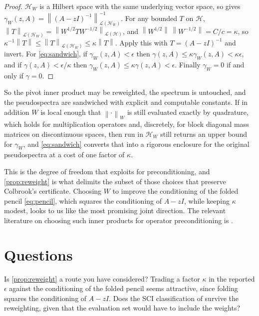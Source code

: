 \documentclass[11pt,a4paper]{article}
\theoremstyle{plain}
\newcommand{\norm}[1]{\left\|#1\right\|}
\newcommand{\Hb}{\mathcal{H}}
\begin{document}
\begin{proof}
  $\Hb_W$ is a Hilbert space with the same underlying vector space, so
  \cite[Lemma~1.2.5]{Colbrook2026} gives $\gamma_W(z,A) = \norm{(A -
  zI)^{-1}}_{\mathcal{L}(\Hb_W)}^{-1}$.  For any bounded $T$ on $\Hb$,
  $\norm{T}_{\mathcal{L}(\Hb_W)} = \norm{W^{1/2}TW^{-1/2}}_{\mathcal{L}(\Hb)}$,
  and $\norm{W^{1/2}}\,\norm{W^{-1/2}} = C/c = \kappa$, so
  $\kappa^{-1}\norm{T} \le \norm{T}_{\mathcal{L}(\Hb_W)} \le \kappa\norm{T}$.
  Apply this with $T = (A - zI)^{-1}$ and invert.  For \cref{eq:sandwich}, if
  $\gamma_W(z,A) < \epsilon$ then $\gamma(z,A) \le \kappa\gamma_W(z,A) <
  \kappa\epsilon$, and if $\gamma(z,A) < \epsilon/\kappa$ then $\gamma_W(z,A)
  \le \kappa\gamma(z,A) < \epsilon$.  Finally $\gamma_W = 0$ if and only if
  $\gamma = 0$.
\end{proof}

So the pivot inner product may be reweighted, the spectrum is untouched, and the
pseudospectra are sandwiched with explicit and computable constants.  If in
addition $W$ is local enough that $\norm{\cdot}_W$ is still evaluated exactly by
quadrature, which holds for multiplication operators and, discretely, for block
diagonal mass matrices on discontinuous spaces, then
\cite[Algorithm~3.4]{Colbrook2026} run in $\Hb_W$ still returns an upper bound
for $\gamma_W$, and \cref{eq:sandwich} converts that into a rigorous enclosure
for the original pseudospectra at a cost of one factor of $\kappa$.

This is the degree of freedom that
\cite{LazzarinoNakatsukasaZerbinati2026} exploits for preconditioning, and
\cref{prop:reweight} is what delimits the subset of those choices that preserve
Colbrook's certificate.  Choosing $W$ to improve the conditioning of the folded
pencil \cref{eq:pencil}, which squares the conditioning of $A - zI$, while
keeping $\kappa$ modest, looks to us like the most promising joint direction.
The relevant literature on choosing such inner products for operator
preconditioning is \cite{Kirby2010,MardalWinther2011}.

\section{Questions}
\label{sec:questions}

\begin{question}
  Is \cref{prop:reweight} a route you have considered?  Trading a factor
  $\kappa$ in the reported $\epsilon$ against the conditioning of the folded
  pencil seems attractive, since folding squares the conditioning of $A - zI$.
  Does the SCI classification of \cite[Theorem~3.4.6]{Colbrook2026} survive the
  reweighting, given that the evaluation set would have to include the weights?
\end{question}
\end{document}
